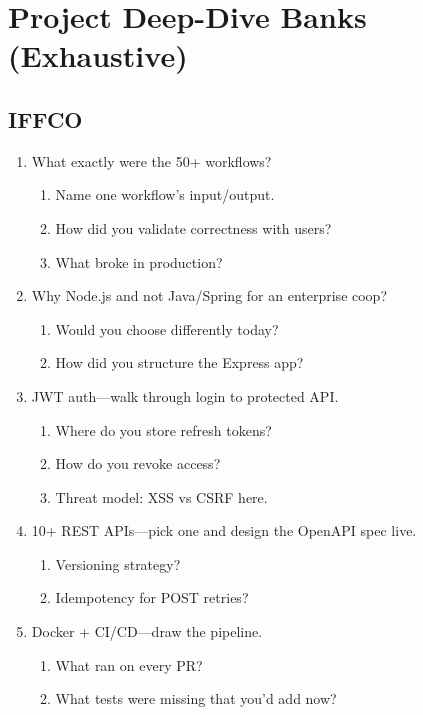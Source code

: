 \documentclass[9pt,a4paper]{article}
\begin{document}
\section{Project Deep-Dive Banks (Exhaustive)}
\subsection{IFFCO}
\begin{enumerate}[label=\textbf{Q\arabic*:}, leftmargin=*]
  \item What exactly were the 50+ workflows?
  \begin{enumerate}[label=\textit{FU\arabic*:}, leftmargin=2em]
    \item Name one workflow's input/output.
    \item How did you validate correctness with users?
    \item What broke in production?
  \end{enumerate}
  \item Why Node.js and not Java/Spring for an enterprise coop?
  \begin{enumerate}[label=\textit{FU\arabic*:}, leftmargin=2em]
    \item Would you choose differently today?
    \item How did you structure the Express app?
  \end{enumerate}
  \item JWT auth---walk through login to protected API.
  \begin{enumerate}[label=\textit{FU\arabic*:}, leftmargin=2em]
    \item Where do you store refresh tokens?
    \item How do you revoke access?
    \item Threat model: XSS vs CSRF here.
  \end{enumerate}
  \item 10+ REST APIs---pick one and design the OpenAPI spec live.
  \begin{enumerate}[label=\textit{FU\arabic*:}, leftmargin=2em]
    \item Versioning strategy?
    \item Idempotency for POST retries?
  \end{enumerate}
  \item Docker + CI/CD---draw the pipeline.
  \begin{enumerate}[label=\textit{FU\arabic*:}, leftmargin=2em]
    \item What ran on every PR?
    \item What tests were missing that you'd add now?
  \end{enumerate}
\end{enumerate}
\end{document}
